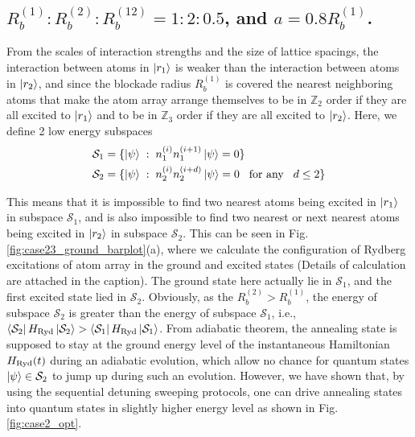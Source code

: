 \documentclass[%
 reprint,
nofootinbib,
 amsmath,amssymb,
 aps,
pra,
floatfix,
]{revtex4-2}
\begin{document}
\subsection{$R^{(1)}_b:R^{(2)}_b:R^{(12)}_b=1:2:0.5$, {\rm and} $a=0.8R^{(1)}_b$.} 
From the scales of interaction strengths and the size of lattice spacings, the interaction between atoms in $\ket{r_1}$ is weaker than the interaction between atoms in $\ket{r_2}$, and since the blockade radius $R^{(1)}_b$ is covered the nearest neighboring atoms that make the atom array arrange themselves to be in $\mathbb{Z}_2$ order if they are all excited to $\ket{r_1}$ and to be in $\mathbb{Z}_3$ order if they are all excited to $\ket{r_2}$. Here, we define 2 low energy subspaces 
\begin{align}\label{subspace_case1}
     & \mathcal{S}_1 = \{ \ket{\psi} \hspace{1mm} :\hspace{1mm} n^{(i)}_1 n^{(i+1)}_1 \ket{\psi} = 0  \} \nonumber \\
     & \mathcal{S}_2 = \{ \ket{\psi} \hspace{1mm} :\hspace{1mm} n^{(i)}_2 n^{(i+d)}_2 \ket{\psi} = 0 \hspace{3mm} \textit{\rm for any} \hspace{3mm} d \leq 2 \}
\end{align}

This means that it is impossible to find two nearest atoms being excited in $\ket{r_1}$ in subspace $\mathcal{S}_1$, and is also impossible to find two nearest or next nearest atoms being excited in $\ket{r_2}$ in subspace $\mathcal{S}_2$. This can be seen in Fig.\ref{fig:case23_ground_barplot}(a), where we calculate the configuration of Rydberg excitations of atom array in the ground and excited states (Details of calculation are attached in the caption). The ground state here actually lie in $\mathcal{S}_1$, and the first excited state lied in $\mathcal{S}_2$. Obviously, as the $R^{(2)}_b > R^{(1)}_b$, the energy of subspace $\mathcal{S}_2$ is greater than the energy of subspace $\mathcal{S}_1$, i.e., $\bra{\mathcal{S}_2}H_{\rm Ryd}\ket{\mathcal{S}_2} > \bra{\mathcal{S}_1}H_{\rm Ryd}\ket{\mathcal{S}_1}$. From adiabatic theorem, the annealing state is supposed to stay at the ground energy level of the instantaneous Hamiltonian $H_{\rm Ryd}(t)$ during an adiabatic evolution, which allow no chance for quantum states $\ket{\psi} \in \mathcal{S}_2$ to jump up during such an evolution. However, we have shown that, by using the sequential detuning sweeping protocols, one can drive annealing states into quantum states in slightly higher energy level as shown in Fig.\ref{fig:case2_opt}.
\end{document}
